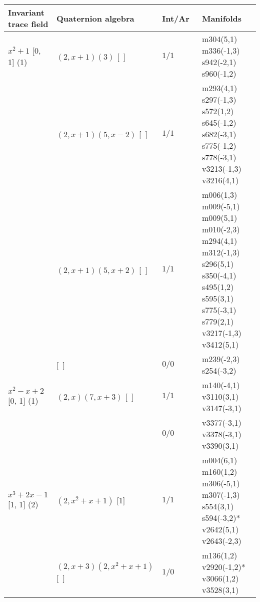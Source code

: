 \documentclass[a4paper]{amsart}
\newcommand{\PreserveBackslash}[1]{\let\temp =\\#1\let\\=\temp}
\theoremstyle{definition}
\begin{document}
\begin{table}[p] 
\centering
\begin{tabular}{|>{\PreserveBackslash\raggedright}p{3.5cm}
	|>{\PreserveBackslash\raggedright}p{3.5cm}|l %
	|>{\PreserveBackslash\raggedright}p{5cm}|}

\hline

Invariant trace field & Quaternion algebra &  Int/Ar\ & Manifolds \\

\hline

\hbox{$x^2 + 1$} [0, 1] (1) &
\hbox{$(2, x + 1) (3)$} [~]&
$1/1$ &
{m304(5,1) m336(-1,3) s942(-2,1) s960(-1,2)} \\

\cline{2-4}

& %
\hbox{$(2, x + 1) (5, x - 2)$} [~]&
$1/1$ &
{m293(4,1) s297(-1,3) s572(1,2) s645(-1,2) s682(-3,1) s775(-1,2) s778(-3,1) v3213(-1,3) v3216(4,1)} \\

\cline{2-4}

& %
\hbox{$(2, x + 1) (5, x + 2)$} [~]&
$1/1$ &
{m006(1,3) m009(-5,1) m009(5,1) m010(-2,3) m294(4,1) m312(-1,3) s296(5,1) s350(-4,1) s495(1,2) s595(3,1) s775(-3,1) s779(2,1) v3217(-1,3) v3412(5,1)} \\

\cline{2-4}

& %
[~] &
$0/0$ &
{m239(-2,3) s254(-3,2)} \\

\hline

\hbox{$x^2 - x + 2$} [0, 1] (1) &
\hbox{$(2, x) (7, x + 3)$} [~]&
$1/1$ &
{m140(-4,1) v3110(3,1) v3147(-3,1)} \\

\cline{3-4}

& %
& %
$0/0$ &
{v3377(-3,1) v3378(-3,1) v3390(3,1)} \\

\hline

\hbox{$x^3 + 2x - 1$} [1, 1] (2) &
\hbox{$(2, x^2 + x + 1)$} [1]&
$1/1$ &
{m004(6,1) m160(1,2) m306(-5,1) m307(-1,3) s554(3,1) s594(-3,2)* v2642(5,1) v2643(-2,3)} \\

\cline{2-4}

& %
\hbox{$(2, x + 3) (2, x^2 + x + 1)$} [~]&
$1/0$ &
{m136(1,2) v2920(-1,2)* v3066(1,2) v3528(3,1)} \\


\end{tabular}
\end{table}
\end{document}
